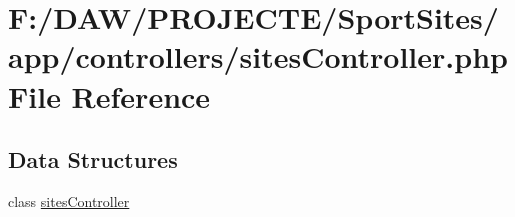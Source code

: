 \hypertarget{sites_controller_8php}{}\section{F\+:/\+D\+A\+W/\+P\+R\+O\+J\+E\+C\+T\+E/\+Sport\+Sites/app/controllers/sites\+Controller.php File Reference}
\label{sites_controller_8php}
\subsection*{Data Structures}
\begin{DoxyCompactItemize}
\item 
class \hyperlink{classsites_controller}{sites\+Controller}
\end{DoxyCompactItemize}
